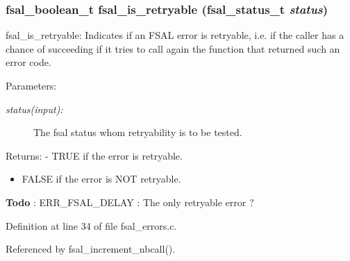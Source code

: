 \subsubsection{\setlength{\rightskip}{0pt plus 5cm}fsal\_\-boolean\_\-t fsal\_\-is\_\-retryable (fsal\_\-status\_\-t {\em status})}\label{fsal__errors_8c_a0}


fsal\_\-is\_\-retryable: Indicates if an FSAL error is retryable, i.e. if the caller has a chance of succeeding if it tries to call again the function that returned such an error code.

\begin{Desc}
\item[Parameters:]
\begin{description}
\item[{\em status(input):}]The fsal status whom retryability is to be tested.\end{description}
\end{Desc}
\begin{Desc}
\item[Returns:]- TRUE if the error is retryable.\begin{itemize}
\item FALSE if the error is NOT retryable.\end{itemize}
\end{Desc}


\begin{Desc}
\item[{\bf Todo}]: ERR\_\-FSAL\_\-DELAY : The only retryable error ?\end{Desc}


Definition at line 34 of file fsal\_\-errors.c.

Referenced by fsal\_\-increment\_\-nbcall().